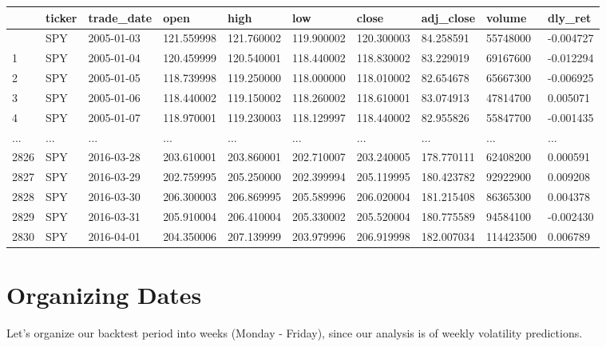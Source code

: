 \documentclass[
  letterpaper,
  DIV=11,
  numbers=noendperiod]{scrreprt}
\begin{document}
\begin{longtable}[]{@{}llllllllll@{}}
\toprule\noalign{}
& ticker & trade\_date & open & high & low & close & adj\_close & volume
& dly\_ret \\
\midrule\noalign{}
\endhead
\bottomrule\noalign{}
\endlastfoot
0 & SPY & 2005-01-03 & 121.559998 & 121.760002 & 119.900002 & 120.300003
& 84.258591 & 55748000 & -0.004727 \\
1 & SPY & 2005-01-04 & 120.459999 & 120.540001 & 118.440002 & 118.830002
& 83.229019 & 69167600 & -0.012294 \\
2 & SPY & 2005-01-05 & 118.739998 & 119.250000 & 118.000000 & 118.010002
& 82.654678 & 65667300 & -0.006925 \\
3 & SPY & 2005-01-06 & 118.440002 & 119.150002 & 118.260002 & 118.610001
& 83.074913 & 47814700 & 0.005071 \\
4 & SPY & 2005-01-07 & 118.970001 & 119.230003 & 118.129997 & 118.440002
& 82.955826 & 55847700 & -0.001435 \\
... & ... & ... & ... & ... & ... & ... & ... & ... & ... \\
2826 & SPY & 2016-03-28 & 203.610001 & 203.860001 & 202.710007 &
203.240005 & 178.770111 & 62408200 & 0.000591 \\
2827 & SPY & 2016-03-29 & 202.759995 & 205.250000 & 202.399994 &
205.119995 & 180.423782 & 92922900 & 0.009208 \\
2828 & SPY & 2016-03-30 & 206.300003 & 206.869995 & 205.589996 &
206.020004 & 181.215408 & 86365300 & 0.004378 \\
2829 & SPY & 2016-03-31 & 205.910004 & 206.410004 & 205.330002 &
205.520004 & 180.775589 & 94584100 & -0.002430 \\
2830 & SPY & 2016-04-01 & 204.350006 & 207.139999 & 203.979996 &
206.919998 & 182.007034 & 114423500 & 0.006789 \\
\end{longtable}

\hypertarget{organizing-dates}{%
\section{Organizing Dates}\label{organizing-dates}}

Let's organize our backtest period into weeks (Monday - Friday), since
our analysis is of weekly volatility predictions.
\end{document}

